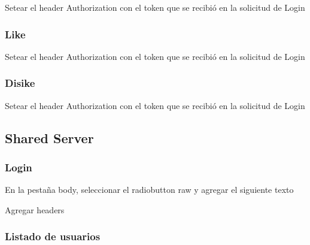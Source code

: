 \documentclass[letterpaper,10pt,english]{sphinxmanual}
\begin{document}

Setear el header Authorization con el token que se recibió en la solicitud de Login



\subsubsection{Like}
\label{manuals:like}

Setear el header Authorization con el token que se recibió en la solicitud de Login



\subsubsection{Disike}
\label{manuals:disike}

Setear el header Authorization con el token que se recibió en la solicitud de Login



\subsection{Shared Server}
\label{manuals:id5}

\subsubsection{Login}
\label{manuals:id6}

En la pestaña body, seleccionar el radiobutton raw y agregar el siguiente texto


Agregar headers



\subsubsection{Listado de  usuarios}
\label{manuals:id7}
\end{document}
